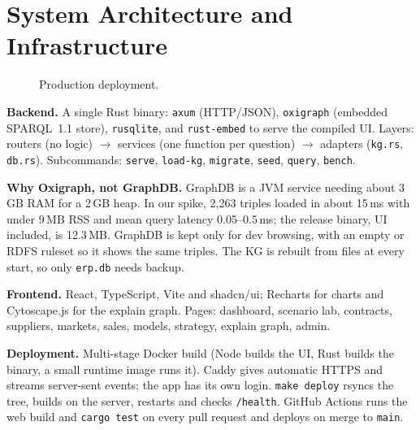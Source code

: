 \documentclass[conference]{IEEEtran}
\begin{document}
\section{System Architecture and Infrastructure}
\begin{figure}[t]
\centering
{}
\caption{Production deployment.}\label{fig:arch}
\end{figure}

\textbf{Backend.} A single Rust binary: \texttt{axum} (HTTP/JSON), \texttt{oxigraph} (embedded SPARQL~1.1 store), \texttt{rusqlite}, and \texttt{rust-embed} to serve the compiled UI. Layers: routers (no logic) $\rightarrow$ services (one function per question) $\rightarrow$ adapters (\texttt{kg.rs}, \texttt{db.rs}). Subcommands: \texttt{serve}, \texttt{load-kg}, \texttt{migrate}, \texttt{seed}, \texttt{query}, \texttt{bench}.

\textbf{Why Oxigraph, not GraphDB.} GraphDB is a JVM service needing about 3\,GB RAM for a 2\,GB heap. In our spike, 2{,}263 triples loaded in about 15\,ms with under 9\,MB RSS and mean query latency 0.05--0.5\,ms; the release binary, UI included, is 12.3\,MB. GraphDB is kept only for dev browsing, with an empty or RDFS ruleset so it shows the same triples. The KG is rebuilt from files at every start, so only \texttt{erp.db} needs backup.

\textbf{Frontend.} React, TypeScript, Vite and shadcn/ui; Recharts for charts and Cytoscape.js for the explain graph. Pages: dashboard, scenario lab, contracts, suppliers, markets, sales, models, strategy, explain graph, admin.

\textbf{Deployment.} Multi-stage Docker build (Node builds the UI, Rust builds the binary, a small runtime image runs it). Caddy gives automatic HTTPS and streams server-sent events; the app has its own login. \texttt{make deploy} rsyncs the tree, builds on the server, restarts and checks \texttt{/health}. GitHub Actions runs the web build and \texttt{cargo test} on every pull request and deploys on merge to \texttt{main}.
\end{document}
